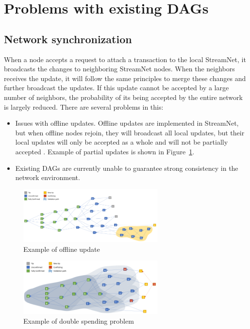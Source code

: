 \section{Problems with existing DAGs}
\subsection{Network synchronization}
When a node accepts a request to attach a transaction to the local StreamNet, it broadcasts the changes to neighboring StreamNet nodes. 
When the neighbors receives the update, it will follow the same principles to merge these changes and further broadcast the updates. 
If this update cannot be accepted by a large number of neighbors, the probability of its being accepted by the entire network is largely reduced.
There are several problems in this:
\begin{itemize}
	\item Issues with offline updates. Offline updates are implemented in StreamNet, but when offline nodes rejoin, 
              they will broadcast all local updates, but their local updates will only be accepted as a whole and will not be partially accepted \cite{iota_presentation}.
              Example of partial updates is shown in Figure~\ref{offline}.
	\item Existing DAGs are currently unable to guarantee strong consistency in the network environment.
\end{itemize}

\begin{figure}[ht]
\begin{center}
	\includegraphics[width=0.65\textwidth]{figures/offline.png}
        \caption{Example of offline update \cite{iota_presentation} }
	\label{offline}
\end{center}
\end{figure}

\begin{figure}[ht]
\begin{center}
	\includegraphics[width=0.65\textwidth]{figures/double_spend.png}
	\caption{Example of double spending problem}
	\label{double_spend}
\end{center}
\end{figure}

